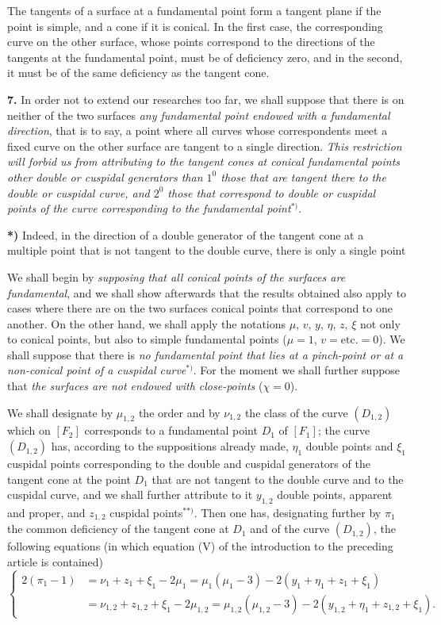 \documentclass{article}
\begin{document}
The tangents of a surface at a fundamental point form a tangent plane if the point is simple, and a cone if it is conical. In the first case, the corresponding curve on the other surface, whose points correspond to the directions of the tangents at the fundamental point, must be of deficiency zero, and in the second, it must be of the same deficiency as the tangent cone.

\textbf{7.} In order not to extend our researches too far, we shall suppose that there is on neither of the two surfaces \emph{any fundamental point endowed with a fundamental direction}, that is to say, a point where all curves whose correspondents meet a fixed curve on the other surface are tangent to a single direction. \emph{This restriction will forbid us from attributing to the tangent cones at conical fundamental points other double or cuspidal generators than $1^0$ those that are tangent there to the double or cuspidal curve, and $2^0$ those that correspond to double or cuspidal points of the curve corresponding to the fundamental point}${}^{*)}$.

\textbf{*)} Indeed, in the direction of a double generator of the tangent cone at a multiple point that is not tangent to the double curve, there is only a single point

We shall begin by \emph{supposing that all conical points of the surfaces are fundamental}, and we shall show afterwards that the results obtained also apply to cases where there are on the two surfaces conical points that correspond to one another. On the other hand, we shall apply the notations $\mu$, $v$, $y$, $\eta$, $z$, $\xi$ not only to conical points, but also to simple fundamental points ($\mu = 1$, $v = \text{etc.} = 0$). We shall suppose that there is \emph{no fundamental point that lies at a pinch-point or at a non-conical point of a cuspidal curve}${}^{*)}$. For the moment we shall further suppose that \emph{the surfaces are not endowed with close-points} ($\chi = 0$).

We shall designate by $\mu_{1, 2}$ the order and by $\nu_{1, 2}$ the class of the curve $(D_{1, 2})$ which on $[F_2]$ corresponds to a fundamental point $D_1$ of $[F_1]$; the curve $(D_{1, 2})$ has, according to the suppositions already made, $\eta_1$ double points and $\xi_1$ cuspidal points corresponding to the double and cuspidal generators of the tangent cone at the point $D_1$ that are not tangent to the double curve and to the cuspidal curve, and we shall further attribute to it $y_{1, 2}$ double points, apparent and proper, and $z_{1, 2}$ cuspidal points${}^{**)}$. Then one has, designating further by $\pi_1$ the common deficiency of the tangent cone at $D_1$ and of the curve $(D_{1, 2})$, the following equations (in which equation (V) of the introduction to the preceding article is contained)
\[
\left\{
\begin{aligned}
2(\pi_1 - 1) &= \nu_1 + z_1 + \xi_1 - 2\mu_1 = \mu_1(\mu_1 - 3) - 2(y_1 + \eta_1 + z_1 + \xi_1) \\
&= \nu_{1, 2} + z_{1, 2} + \xi_1 - 2\mu_{1, 2} = \mu_{1, 2}(\mu_{1, 2} - 3) - 2(y_{1, 2} + \eta_1 + z_{1, 2} + \xi_1).
\end{aligned}
\right. \tag{2}
\]
\end{document}
